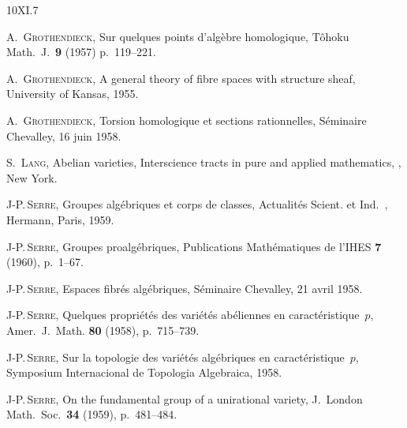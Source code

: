 \begin{thebibliography}{10}{XI.7}

 A.\, \textsc{Grothendieck},
Sur quelques points d'alg\`ebre homologique,
T\^ohoku Math.~J.\ \textbf{9} (1957) p.\, 119--221.

 A.\, \textsc{Grothendieck}, A general theory of fibre spaces with
structure sheaf, University of Kansas, 1955.

 A.\, \textsc{Grothendieck}, Torsion homologique et sections
rationnelles, S\'eminaire \hbox{Chevalley}, 16 juin 1958.

 S.\, \textsc{Lang}, Abelian varieties, Interscience tracts in pure
and applied mathematics, , New York.

J-P.\,\textsc{Serre}, Groupes alg\'ebriques et corps de classes,
Actualit\'es Scient. et Ind.\ , Hermann, Paris, 1959.

J-P.\,\textsc{Serre}, Groupes proalg\'ebriques,
Publications Math\'ematiques de l'IHES \textbf{7} (1960), p.\, 1--67.

J-P.\,\textsc{Serre}, Espaces fibr\'es alg\'ebriques,
S\'eminaire Chevalley, 21 avril 1958.

J-P.\,\textsc{Serre}, Quelques propri\'et\'es des
vari\'et\'es ab\'eliennes en
caract\'eristique~$p$, Amer.\ J.\ Math. \textbf{80} (1958), p.\, 715--739.

J-P.\,\textsc{Serre}, Sur la topologie des vari\'et\'es
alg\'ebriques en
caract\'eristique~$p$,
Symposium Internacional de Topologia
Algebraica, 1958.

J-P.\,\textsc{Serre}, On the fundamental group of a unirational
variety,
J.~London Math.\ Soc.\ \textbf{34} (1959), p.\, 481--484.
\end{thebibliography}


